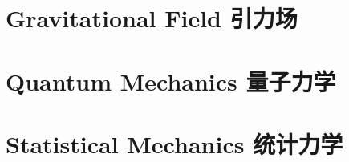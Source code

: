 \documentclass{article}
\begin{document}
\section{Gravitational Field 引力场}



\section{Quantum Mechanics 量子力学}



\section{Statistical Mechanics 统计力学}
\end{document}
